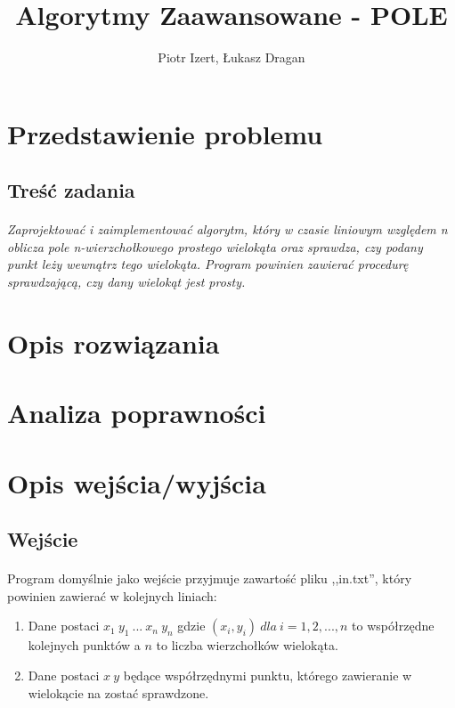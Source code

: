 \documentclass{article}
\author{Piotr Izert, Łukasz Dragan}
\title{Algorytmy Zaawansowane - POLE}
\begin{document}
\maketitle
\newpage
\tableofcontents
\newpage
\section{Przedstawienie problemu}

\subsection{Treść zadania}
\paragraph{}
\textit{
Zaprojektować i zaimplementować algorytm, który w czasie liniowym względem n oblicza pole n-wierzchołkowego prostego wielokąta oraz sprawdza, czy podany punkt leży wewnątrz tego wielokąta. Program powinien zawierać procedurę sprawdzającą, czy dany wielokąt jest prosty.
}
\subsection{}

\section{Opis rozwiązania}
\section{Analiza poprawności}
\section{Opis wejścia/wyjścia}
\subsection{Wejście}
\paragraph{}Program domyślnie jako wejście przyjmuje zawartość pliku ,,in.txt'', który powinien zawierać w kolejnych liniach:
\begin{enumerate}
\item Dane postaci \(x_1\ y_1\ ...\ x_n\ y_n\) gdzie \((x_i,y_i)\ dla\ i=1,2,...,n\) to współrzędne kolejnych punktów a \(n\) to liczba wierzchołków wielokąta.
\item Dane postaci \(x\ y\) będące współrzędnymi punktu, którego zawieranie w wielokącie na zostać sprawdzone.
\end{enumerate}
\end{document}
